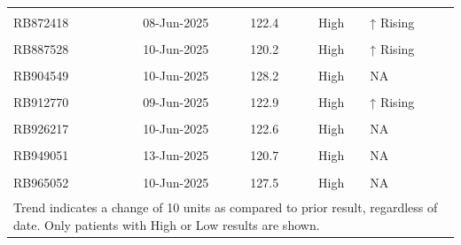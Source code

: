 \documentclass[
]{article}
\begin{document}
\begin{table}[!h]
\begin{tabular}[t]{lcccl}
\cellcolor{gray!10}{RB871113} & \cellcolor{gray!10}{09-Jun-2025} & \cellcolor{gray!10}{121.0} & \cellcolor{gray!10}{High} & \cellcolor{gray!10}{↑ Rising}\\
\addlinespace
RB872418 & 08-Jun-2025 & 122.4 & High & ↑ Rising\\
\cellcolor{gray!10}{RB875248} & \cellcolor{gray!10}{10-Jun-2025} & \cellcolor{gray!10}{122.1} & \cellcolor{gray!10}{High} & \cellcolor{gray!10}{↑ Rising}\\
RB887528 & 10-Jun-2025 & 120.2 & High & ↑ Rising\\
\cellcolor{gray!10}{RB899808} & \cellcolor{gray!10}{07-Jun-2025} & \cellcolor{gray!10}{73.7} & \cellcolor{gray!10}{Low} & \cellcolor{gray!10}{↓ Falling}\\
RB904549 & 10-Jun-2025 & 128.2 & High & NA\\
\addlinespace
\cellcolor{gray!10}{RB910149} & \cellcolor{gray!10}{12-Jun-2025} & \cellcolor{gray!10}{120.4} & \cellcolor{gray!10}{High} & \cellcolor{gray!10}{↑ Rising}\\
RB912770 & 09-Jun-2025 & 122.9 & High & ↑ Rising\\
\cellcolor{gray!10}{RB916177} & \cellcolor{gray!10}{09-Jun-2025} & \cellcolor{gray!10}{125.9} & \cellcolor{gray!10}{High} & \cellcolor{gray!10}{NA}\\
RB926217 & 10-Jun-2025 & 122.6 & High & NA\\
\cellcolor{gray!10}{RB935975} & \cellcolor{gray!10}{12-Jun-2025} & \cellcolor{gray!10}{132.0} & \cellcolor{gray!10}{High} & \cellcolor{gray!10}{↑ Rising}\\
\addlinespace
RB949051 & 13-Jun-2025 & 120.7 & High & NA\\
\cellcolor{gray!10}{RB957703} & \cellcolor{gray!10}{11-Jun-2025} & \cellcolor{gray!10}{123.4} & \cellcolor{gray!10}{High} & \cellcolor{gray!10}{NA}\\
RB965052 & 10-Jun-2025 & 127.5 & High & NA\\
\bottomrule
\multicolumn{5}{l}{\textsuperscript{} Trend indicates a change of 10 units as compared to prior result, regardless of date. Only patients with High or Low results are shown.}\\
\end{tabular}
\end{table}
\end{document}

